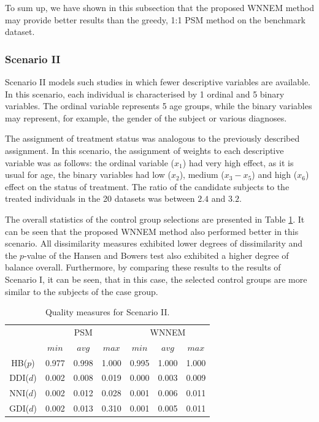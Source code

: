           To sum up, we have shown in this subsection that the proposed WNNEM method may provide better results than the greedy, 1:1 PSM method on the benchmark dataset.
        
		\subsubsection{Scenario II}
		\label{seq:wnnem_scen_2}
								
		Scenario II models such studies in which fewer descriptive variables are available. In this scenario, each individual is characterised by 1 ordinal and 5 binary variables. The ordinal variable represents 5 age groups, while the binary variables may represent, for example, the gender of the subject or various diagnoses.
								
		The assignment of treatment status was analogous to the previously described assignment. In this scenario, the assignment of weights to each descriptive variable was as follows: the ordinal variable ($x_1$) had very high effect, as it is usual for age, the binary variables had low ($x_2$), medium ($x_3-x_5$) and high ($x_6$) effect on the status of treatment. The ratio of the candidate subjects to the treated individuals in the 20 datasets was between $2.4$ and $3.2$. 
								
		The overall statistics of the control group selections are presented in Table \ref{tab:wnnem_scen_II_stat}. It can be seen that the proposed WNNEM method also performed better in this scenario. All dissimilarity measures exhibited lower degrees of dissimilarity and the $p$-value of the Hansen and Bowers test also exhibited a higher degree of balance overall. Furthermore, by comparing these results to the results of Scenario I, it can be seen, that in this case, the selected control groups are more similar to the subjects of the case group.
								
		\begin{table}[h]
			\caption{Quality measures for Scenario II. %
			}
			\label{tab:wnnem_scen_II_stat}
			\centering
			\begin{tabular}{ccccccc} 
				\toprule
				& \multicolumn{3}{c}{PSM} 
				& \multicolumn{3}{c}{WNNEM}\\
				         & $min$ & $avg$ & $max$ & $min$ & $avg$ & $max$ \\
				\midrule
				HB($p$)  & 0.977 & 0.998 & 1.000 & 0.995 & 1.000 & 1.000 \\
				DDI($d$) & 0.002 & 0.008 & 0.019 & 0.000 & 0.003 & 0.009 \\
				\midrule
				NNI($d$) & 0.002 & 0.012 & 0.028 & 0.001 & 0.006 & 0.011 \\
				GDI($d$) & 0.002 & 0.013 & 0.310 & 0.001 & 0.005 & 0.011 \\
				\bottomrule
			\end{tabular}
		\end{table}
								
